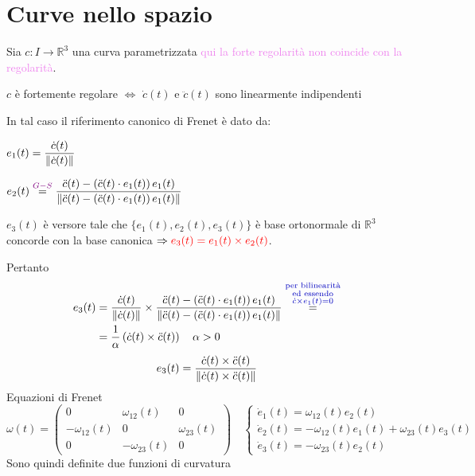     \section{Curve nello spazio}
        Sia $c \colon I \to \mathbb{R}^3$ una curva parametrizzata \textcolor{violet}{qui la forte regolarità non coincide con la regolarità}.

        $c$ è fortemente regolare $\iff$ $\dot{c}(t)$ e $\ddot{c}(t)$ sono linearmente indipendenti

        In tal caso il riferimento canonico di Frenet è dato da:

        \textcolor{red}{$\displaystyle e_1(t) = \frac{\dot{c}(t)}{\lVert\dot{c}(t)\rVert}$} 
        
        \textcolor{red}{$\displaystyle e_2(t) \overset{\textcolor{violet}{G-S}}{=} \frac{\ddot{c}(t) - \left( \ddot{c}(t) \cdot e_1(t) \right) e_1(t)}{\lVert \ddot{c}(t) - \left( \ddot{c}(t) \cdot e_1(t) \right) e_1(t)\rVert}$}

        $e_3(t)$ è versore tale che $\{e_1(t), e_2(t), e_3(t)\}$ è base ortonormale di $\mathbb{R}^3$ concorde con la base canonica $\Rightarrow  \textcolor{red}{e_3(t) = e_1(t) \times e_2(t)}$.

        Pertanto
        \begin{align*}
        e_3(t) &= \frac{\dot{c}(t)}{\norm{\dot{c}(t)}} \times \frac{\ddot{c}(t) - \left( \ddot{c}(t) \cdot e_1(t) \right) e_1(t)}{\norm{ \ddot{c}(t) - \left( \ddot{c}(t) \cdot e_1(t) \right) e_1(t)}} \overset{\textcolor{blu}{\substack{\text{per bilinearità} \\ \text{ed essendo} \\ \dot{c} \times e_1(t)=0 }}}{=} \\
        &= \frac{1}{\alpha} \left(\dot{c}(t) \times \ddot{c}(t) \right) \quad \alpha >0
        \end{align*}
        \[ e_3(t) = \frac{\dot{c}(t) \times \ddot{c}(t)}{\lVert\dot{c}(t) \times \ddot{c}(t)\rVert} \]
        Equazioni di Frenet
        \[ \omega(t) = \begin{pmatrix}
            0 & \omega_{12}(t) & 0 \\
            -\omega_{12}(t) & 0 & \omega_{23}(t) \\
            0 & -\omega_{23}(t) & 0
        \end{pmatrix} \quad 
        \begin{cases}
            \dot{e}_1(t) = \omega_{12}(t) e_2(t) \\
            \dot{e}_2(t) = -\omega_{12}(t) e_1(t) + \omega_{23}(t) e_3(t) \\
            \dot{e}_3(t) = -\omega_{23}(t) e_2(t)
        \end{cases}
        \]
        Sono quindi definite due funzioni di curvatura
        
